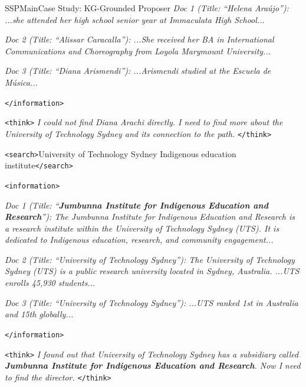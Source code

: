\begin{casepagebox}{SSPMain}{Case Study: KG-Grounded Proposer}
\textit{Doc 1 (Title: ``Helena Ara\'{u}jo''): ...she attended her high school senior year at Immaculata High School...}

\textit{Doc 2 (Title: ``Alissar Caracalla''): ...She received her BA in International Communications and Choreography from Loyola Marymount University...}

\textit{Doc 3 (Title: ``Diana Arismendi''): ...Arismendi studied at the Escuela de M\'{u}sica...}

\textcolor{TagInfo}{\texttt{</information>}}
\vspace{3mm}

\begin{thinkpanel}
\textcolor{TagThink}{\texttt{<think>}} \textit{I could not find Diana Arachi directly. I need to find more about the University of Technology Sydney and its connection to the path.} \textcolor{TagThink}{\texttt{</think>}}
\end{thinkpanel}

\textcolor{TagSearch}{\texttt{<search>}}University of Technology Sydney Indigenous education institute\textcolor{TagSearch}{\texttt{</search>}}

\textcolor{TagInfo}{\texttt{<information>}}

\textit{Doc 1 (Title: ``\colorbox{yellow!30}{\textbf{Jumbunna Institute for Indigenous Education and Research}}''): The Jumbunna Institute for Indigenous Education and Research is a research institute within the University of Technology Sydney (UTS). It is dedicated to Indigenous education, research, and community engagement...}

\textit{Doc 2 (Title: ``University of Technology Sydney''): The University of Technology Sydney (UTS) is a public research university located in Sydney, Australia. ...UTS enrolls 45,930 students...}

\textit{Doc 3 (Title: ``University of Technology Sydney''): ...UTS ranked 1st in Australia and 15th globally...}

\textcolor{TagInfo}{\texttt{</information>}}
\vspace{3mm}

\begin{thinkpanel}
\textcolor{TagThink}{\texttt{<think>}} \textit{I found out that University of Technology Sydney has a subsidiary called \colorbox{yellow!30}{\textbf{Jumbunna Institute for Indigenous Education and Research}}. Now I need to find the director.} \textcolor{TagThink}{\texttt{</think>}}
\end{thinkpanel}


\end{casepagebox}
